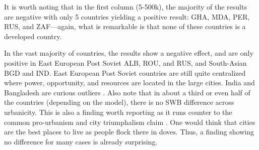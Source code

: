 \documentclass[11pt, letterpaper]{article}
\begin{document}
It is worth noting that in the first column (5-500k), the majority of the results are
negative with only 5 countries yielding a positive result: GHA, MDA, PER, RUS,
and ZAF---again, what is remarkable is that none of these countries is a
developed country.




In the vast majority of countries, the results show a negative effect, and are only positive in East European Post Soviet ALB, ROU, and RUS, and South-Asian BGD and IND.
East European Post Soviet countries are still quite centralized where power, opportunity, and resources are located in the large cities. %
India and Bangladesh are curious outliers \citep[for some discussion see][]{deb2020exploring}.
Also note that in about a third or even half of the countries (depending on the
model), there is no SWB difference across urbanicity. This is also a finding
worth reporting as it runs counter to the common pro-urbanism and city triumphalism claim \citep[e.g.,][]{glaeser11}.
%
One would think that cities are the best places to live as people flock there in doves.
Thus, a finding showing no difference for many cases is already surprising.
\end{document}
